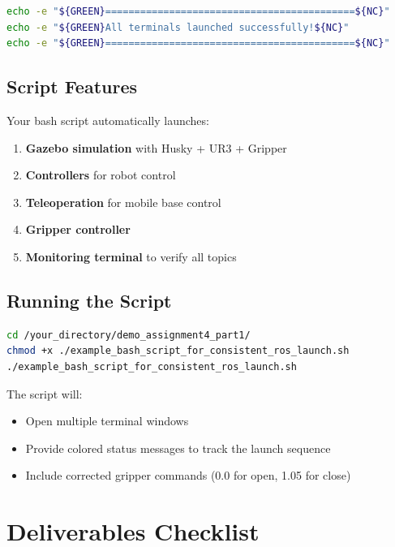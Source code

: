 \documentclass[11pt,a4paper]{article}
\begin{document}
\begin{lstlisting}[language=bash, caption=ROS2 Launch Script, basicstyle=\ttfamily\scriptsize]
echo -e "${GREEN}===========================================${NC}"
echo -e "${GREEN}All terminals launched successfully!${NC}"
echo -e "${GREEN}===========================================${NC}"
\end{lstlisting}

\subsection{Script Features}

\begin{successbox}
Your bash script automatically launches:
\begin{enumerate}[nosep]
    \item \textbf{Gazebo simulation} with Husky + UR3 + Gripper
    \item \textbf{Controllers} for robot control
    \item \textbf{Teleoperation} for mobile base control
    \item \textbf{Gripper controller}
    \item \textbf{Monitoring terminal} to verify all topics
\end{enumerate}
\end{successbox}

\subsection{Running the Script}

\begin{lstlisting}[language=bash, caption=Execute Script]
cd /your_directory/demo_assignment4_part1/
chmod +x ./example_bash_script_for_consistent_ros_launch.sh
./example_bash_script_for_consistent_ros_launch.sh
\end{lstlisting}

The script will:
\begin{itemize}[nosep]
    \item Open multiple terminal windows
    \item Provide colored status messages to track the launch sequence
    \item Include corrected gripper commands (0.0 for open, 1.05 for close)
\end{itemize}

\section{Deliverables Checklist}
\end{document}
